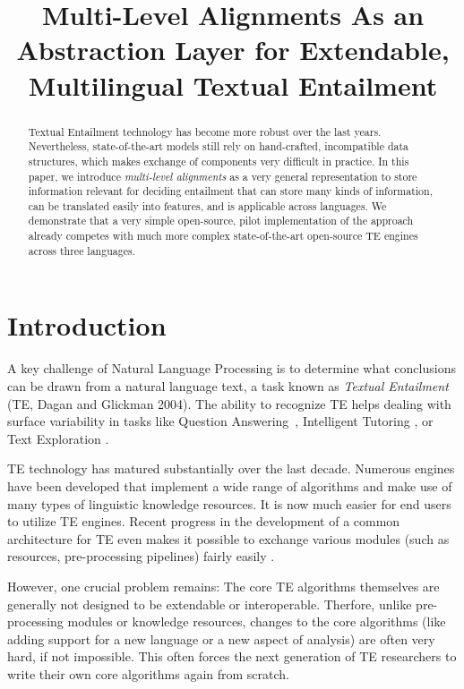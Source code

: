 \documentclass[11pt,letterpaper]{article}
\title{Multi-Level Alignments As an Abstraction Layer for Extendable,
  Multilingual Textual Entailment}
\date{}
\begin{document}
\maketitle
\begin{abstract}
  Textual Entailment technology has become more robust over the last
  years. Nevertheless, state-of-the-art models still rely on
  hand-crafted, incompatible data structures, which makes exchange of
  components very difficult in practice. In this paper, we introduce
  {\em multi-level alignments} as a very general representation to
  store information relevant for deciding entailment that can store
  many kinds of information, can be translated easily into features,
  and is applicable across languages. We demonstrate that a very
  simple open-source, pilot implementation of the approach already
  competes with much more complex state-of-the-art open-source TE
  engines across three languages.
\end{abstract}

\section{Introduction}
A key challenge of Natural Language Processing is to determine what
conclusions can be drawn from a natural language text, a task known as
\textit{Textual Entailment} (TE, Dagan and Glickman
2004).\nocite{dagan04:_probab_textual_entail} The ability to recognize
TE helps dealing with surface variability in tasks like Question
Answering~\cite{harabagiu-hickl:2006:COLACL}, Intelligent Tutoring
\cite{nielsen09:_recog_entail_in_intel_tutor_system}, or Text
Exploration \cite{berant2012learning}.

TE technology has matured substantially over the last decade. Numerous
engines have been developed that implement a wide range of algorithms
and make use of many types of linguistic knowledge resources. It is
now much easier for end users to utilize TE engines. Recent progress
in the development of a common architecture for TE even makes it
possible to exchange various modules (such as resources,
pre-processing pipelines) fairly easily \cite{EOP-arch}.

However, one crucial problem remains: The core TE algorithms
themselves are generally not designed to be extendable or
interoperable. Therfore, unlike pre-processing modules or knowledge
resources, changes to the core algorithms (like adding support for a
new language or a new aspect of analysis) are often very hard, if not
impossible. This often forces the next generation of TE researchers to
write their own core algorithms again from scratch.
\end{document}
